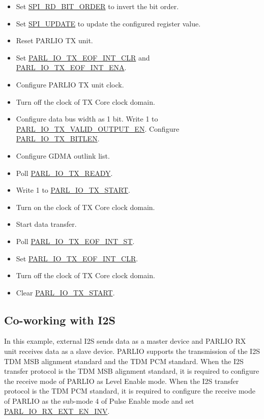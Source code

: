\documentclass[main\_\_EN.tex]{subfiles}
\begin{document}
\begin{itemize}
\begin{itemize}
        \item Set \hyperref[fielddesc:SPIRDBITORDER]{SPI\_RD\_BIT\_ORDER} to invert the bit order.
        \item Set \hyperref[fielddesc:SPIUPDATE]{SPI\_UPDATE} to update the configured register value.   
        \item Reset PARLIO TX unit.
        \item Set \hyperref[fielddesc:PARLIOTXEOFINTCLR]{PARL\_IO\_TX\_EOF\_INT\_CLR} and \hyperref[fielddesc:PARLIOTXEOFINTENA]{PARL\_IO\_TX\_EOF\_INT\_ENA}.
        \item Configure PARLIO TX unit clock.
        \item Turn off the clock of TX Core clock domain.
        \item Configure data bus width as 1 bit. Write 1 to \hyperref[fielddesc:PARLIOTXVALIDOUTPUTEN]{PARL\_IO\_TX\_VALID\_OUTPUT\_EN}. Configure \hyperref[fielddesc:PARLIOTXBITLEN]{PARL\_IO\_TX\_BITLEN}. 
        \item Configure GDMA outlink list. 
        \item Poll \hyperref[fielddesc:PARLIOTXREADY]{PARL\_IO\_TX\_READY}.
        \item Write 1 to \hyperref[fielddesc:PARLIOTXSTART]{PARL\_IO\_TX\_START}.
        \item Turn on the clock of TX Core clock domain.
        \item Start data transfer.
        \item Poll \hyperref[fielddesc:PARLIOTXEOFINTST]{PARL\_IO\_TX\_EOF\_INT\_ST}.
        \item Set \hyperref[fielddesc:PARLIOTXEOFINTCLR]{PARL\_IO\_TX\_EOF\_INT\_CLR}.
        \item Turn off the clock of TX Core clock domain.
        \item Clear \hyperref[fielddesc:PARLIOTXSTART]{PARL\_IO\_TX\_START}.         
    \end{itemize} 
\end{itemize}

\subsection{Co-working with I2S}
In this example, external I2S sends data as a master device and PARLIO RX unit receives data as a slave device. PARLIO supports the transmission of the I2S TDM MSB alignment standard and the TDM PCM standard. When the I2S transfer protocol is the TDM MSB alignment standard, it is required to configure the receive mode of PARLIO as Level Enable mode. When the I2S transfer protocol is the TDM PCM standard, it is required to configure the receive mode of PARLIO as the sub-mode 4 of Pulse Enable mode and set \hyperref[fielddesc:PARLIORXEXTENINV]{PARL\_IO\_RX\_EXT\_EN\_INV}.
\end{document}
